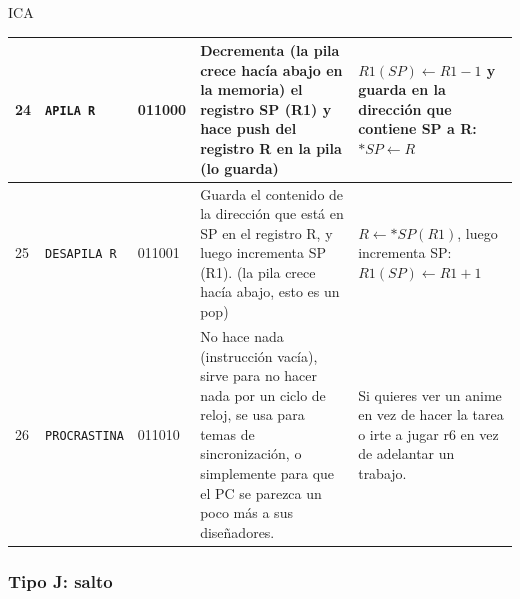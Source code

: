 ICA\documentclass{article}
\begin{document}
\begin{longtable}{|p{}|p{}|p{}|p{}|p{}|}
  \hline
  24              & \texttt{APILA R}     & 011000                          & Decrementa (la pila crece hacía abajo en la memoria) el registro SP (R1) y hace push del registro R en la pila (lo guarda)                                                                    & $R1 (SP) \leftarrow R1 - 1$ y guarda en la dirección que contiene SP a R:  $*SP \leftarrow R$                       \\
  \hline
  25              & \texttt{DESAPILA R}  & 011001                          & Guarda el contenido de la dirección que está en SP en el registro R, y luego incrementa SP (R1). (la pila crece hacía abajo, esto es un pop)                                                  & $R \leftarrow *SP(R1)$, luego incrementa SP: $R1(SP) \leftarrow  R1 + 1 $                                           \\
  \hline
  26              & \texttt{PROCRASTINA} & 011010                          & No hace nada (instrucción vacía), sirve para no hacer nada por un ciclo de reloj, se usa para temas de sincronización, o simplemente para que el PC se parezca un poco más a sus diseñadores. & Si quieres ver un anime en vez de hacer la tarea o irte a jugar r6 en vez de adelantar un trabajo.                  \\
  \hline
\end{longtable}

\subsubsection{Tipo J: \textbf{salto}}
\end{document}

